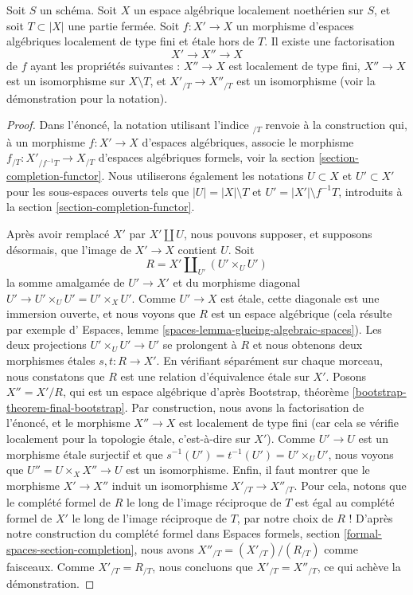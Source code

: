 \begin{lemma}
\label{lemma-smash-away-from-T}
Soit $S$ un schéma. Soit $X$ un espace algébrique localement noethérien sur
$S$, et soit $T \subset |X|$ une partie fermée. Soit $f : X' \to X$ un
morphisme d'espaces algébriques localement de type fini et étale hors de $T$.
Il existe une factorisation
$$
X' \longrightarrow X'' \longrightarrow X
$$
de $f$ ayant les propriétés suivantes :
$X'' \to X$ est localement de type fini,
$X'' \to X$ est un isomorphisme sur $X \setminus T$, et
$X'_{/T} \to X''_{/T}$ est un isomorphisme (voir la démonstration pour la notation).
\end{lemma}

\begin{proof}
Dans l'énoncé, la notation utilisant l'indice ${}_{/T}$ renvoie à la
construction qui, à un morphisme $f : X' \to X$ d'espaces algébriques,
associe le morphisme $f_{/T} : X'_{/f^{-1}T} \to X_{/T}$ d'espaces
algébriques formels, voir la section \ref{section-completion-functor}.
Nous utiliserons également les notations $U \subset X$ et $U' \subset X'$
pour les sous-espaces ouverts tels que $|U| = |X| \setminus T$ et
$U' = |X'| \setminus f^{-1}T$, introduits à la
section \ref{section-completion-functor}.

\medskip\noindent
Après avoir remplacé $X'$ par $X' \amalg U$, nous pouvons supposer, et
supposons désormais, que l'image de $X' \to X$ contient $U$.
Soit
$$
R = X' \amalg_{U'} (U' \times_U U')
$$
la somme amalgamée de $U' \to X'$ et du morphisme diagonal
$U' \to U' \times_U U' = U' \times_X U'$. Comme $U' \to X$ est étale,
cette diagonale est une immersion ouverte, et nous voyons que $R$ est un
espace algébrique (cela résulte par exemple d'
Espaces, lemme \ref{spaces-lemma-glueing-algebraic-spaces}).
Les deux projections $U' \times_U U' \to U'$ se prolongent à $R$
et nous obtenons deux morphismes étales $s, t : R \to X'$.
En vérifiant séparément sur chaque morceau, nous constatons que $R$
est une relation d'équivalence étale sur $X'$. Posons $X'' = X'/R$,
qui est un espace algébrique d'après
Bootstrap, théorème \ref{bootstrap-theorem-final-bootstrap}.
Par construction, nous avons la factorisation de l'énoncé, et
le morphisme $X'' \to X$ est localement de type fini (car cela
se vérifie localement pour la topologie étale, c'est-à-dire sur $X'$).
Comme $U' \to U$ est un morphisme étale surjectif
et que $s^{-1}(U') = t^{-1}(U') = U' \times_U U'$,
nous voyons que $U'' = U \times_X X'' \to U$ est un isomorphisme.
Enfin, il faut montrer que le morphisme $X' \to X''$ induit un isomorphisme
$X'_{/T} \to X''_{/T}$. Pour cela, notons que le complété formel de $R$
le long de l'image réciproque de $T$ est égal au complété formel de
$X'$ le long de l'image réciproque de $T$, par notre choix de $R$ ! D'après
notre construction du complété formel dans
Espaces formels, section \ref{formal-spaces-section-completion},
nous avons $X''_{/T} = (X'_{/T}) / (R_{/T})$ comme faisceaux. Comme
$X'_{/T} = R_{/T}$, nous concluons que $X'_{/T} = X''_{/T}$,
ce qui achève la démonstration.
\end{proof}








